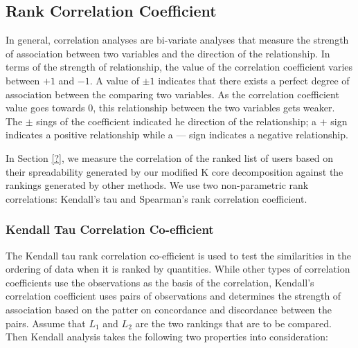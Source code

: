 \documentclass[sigconf]{acmart}
\begin{document}
\subsection{Rank Correlation Coefficient}

In general, correlation analyses are bi-variate analyses that measure the strength of association between two variables and the direction of the relationship. In terms of the strength of relationship, the value of the correlation coefficient varies between $+1$ and $-1$. A value of $\pm 1$ indicates that there exists a perfect degree of association between the comparing two variables. As the correlation coefficient value goes towards $0$, this relationship between the two variables gets weaker. The $\pm$ sings of the coefficient indicated he direction of the relationship; a $+$ sign indicates a positive relationship while a $—$ sign indicates a negative relationship.



In Section \ref{?}, we measure the correlation of the ranked list of users based on their spreadability generated by our modified K core decomposition against the rankings generated by other methods. We use two non-parametric rank correlations: Kendall’s tau and Spearman’s rank correlation coefficient.

\subsubsection{Kendall Tau Correlation Co-efficient}

The Kendall tau rank correlation co-efficient is used to test the similarities in the ordering of data when it is ranked by quantities. While other types of correlation coefficients use the observations as the basis of the correlation, Kendall’s correlation coefficient uses pairs of observations and determines the strength of association based on the patter on concordance and discordance between the pairs. Assume that $L_1$ and $L_2$ are the two rankings that are to be compared. Then Kendall analysis takes the following two properties into consideration:
\end{document}
